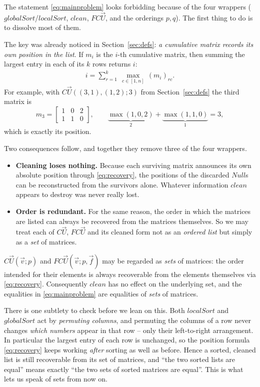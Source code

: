 The statement \eqref{eq:mainproblem} looks forbidding because of the four wrappers
($globalSort$/$localSort$, $clean$, $FC\vec U$, and the orderings $p,q$).  The
first thing to do is to dissolve most of them.

The key was already noticed in Section~\ref{sec:defs}: \emph{a cumulative matrix records its own
position in the list}.  If $m_i$ is the $i$-th cumulative matrix, then summing the
largest entry in each of its $k$ rows returns $i$:
\begin{align}
i=\sum_{r=1}^{k}\ \max_{c\in[1,n]}\,(m_i)_{rc}.
\label{eq:recovery}
\end{align}
For example, with $C\vec U((3,1),(1,2);3)$ from Section~\ref{sec:defs} the third matrix is
\[
m_3=\begin{bmatrix}1&0&2\\1&1&0\end{bmatrix},
\qquad
\underbrace{\max(1,0,2)}_{2}+\underbrace{\max(1,1,0)}_{1}=3,
\]
which is exactly its position.

Two consequences follow, and together they remove three of the four wrappers.

\begin{itemize}
  \item \textbf{Cleaning loses nothing.}  Because each surviving matrix announces
        its own absolute position through \eqref{eq:recovery}, the positions of the
        discarded $Null$s can be reconstructed from the survivors alone.  Whatever
        information $clean$ appears to destroy was never really lost.
  \item \textbf{Order is redundant.}  For the same reason, the order in which the
        matrices are listed can always be recovered from the matrices themselves.
        So we may treat each of $C\vec U$, $FC\vec U$ and its cleaned form not as an
        \emph{ordered list} but simply as a \emph{set} of matrices.
\end{itemize}

\begin{corollary}\label{cor:sets}
$C\vec U(\vec v;p)$ and $FC\vec U(\vec v;p,\vec f)$ may be regarded as
\emph{sets} of matrices: the order intended for their elements is always
recoverable from the elements themselves via \eqref{eq:recovery}.  Consequently
$clean$ has no effect on the underlying set, and the equalities in
\eqref{eq:mainproblem} are equalities of \emph{sets} of matrices.
\end{corollary}

There is one subtlety to check before we lean on this.  Both $localSort$ and
$globalSort$ act by \emph{permuting columns}, and permuting the columns of a row
never changes \emph{which numbers} appear in that row -- only their left-to-right
arrangement.  In particular the largest entry of each row is unchanged, so the
position formula \eqref{eq:recovery} keeps working \emph{after} sorting as well as
before.  Hence a sorted, cleaned list is still recoverable from its set of
matrices, and ``the two sorted lists are equal'' means exactly ``the two sets of
sorted matrices are equal''.  This is what lets us speak of sets from now on.

